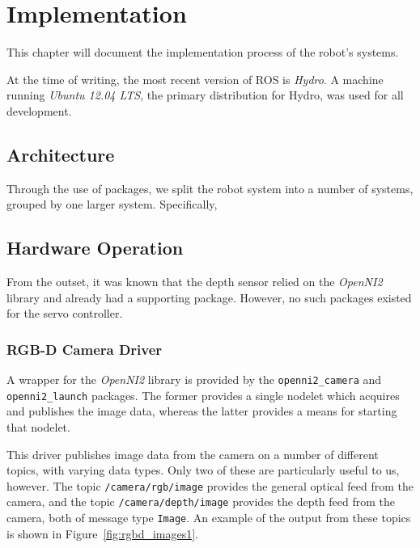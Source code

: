 \chapter{Implementation}
\label{chap:implementation}


This chapter will document the implementation process of the robot's systems.

At the time of writing, the most recent version of ROS is \emph{Hydro}. A machine running \emph{Ubuntu 12.04 LTS}, the primary distribution for Hydro, was used for all development.


\section{Architecture}

Through the use of packages, we split the robot system into a number of systems, grouped by one larger system. Specifically, 


\section{Hardware Operation}

From the outset, it was known that the depth sensor relied on the \emph{OpenNI2} library and already had a supporting package. However, no such packages existed for the servo controller.

\subsection{RGB-D Camera Driver}

A wrapper for the \emph{OpenNI2} library is provided by the \texttt{openni2\_camera} \cite{ros_wiki_openni2_camera} and \texttt{openni2\_launch} \cite{ros_wiki_openni2_launch} packages. The former provides a single nodelet which acquires and publishes the image data, whereas the latter provides a means for starting that nodelet.

This driver publishes image data from the camera on a number of different topics, with varying data types. Only two of these are particularly useful to us, however. The topic \texttt{/camera/rgb/image} provides the general optical feed from the camera, and the topic \texttt{/camera/depth/image} provides the depth feed from the camera, both of message type \texttt{Image}. An example of the output from these topics is shown in Figure~\ref{fig:rgbd_images1}. 

